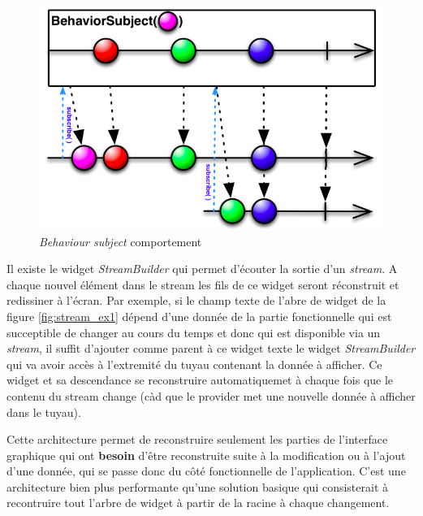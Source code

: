 \begin{figure}[H]
  \includegraphics[width=.7\linewidth]{content/imgs/stream.png}
  \caption{\textit{Behaviour subject} comportement}
  \label{fig:stream}
\end{figure}

Il existe le widget \textit{StreamBuilder} qui permet d'écouter la sortie d'un \textit{stream}. A chaque nouvel élément dans le stream les fils de ce widget seront réconstruit et redissiner à l'écran. Par exemple, si le champ texte de l'abre de widget de la figure \ref{fig:stream_ex1} dépend d'une donnée de la partie fonctionnelle qui est succeptible de changer au cours du temps et donc qui est disponible via un \textit{stream}, il suffit d'ajouter comme parent à ce widget texte le widget \textit{StreamBuilder} qui va avoir accès à l'extremité du tuyau contenant la donnée à afficher. Ce widget et sa descendance se reconstruire automatiquemet à chaque fois que le contenu du stream change (càd que le provider met une nouvelle donnée à afficher dans le tuyau).

Cette architecture permet de reconstruire seulement les parties de l'interface graphique qui ont \textbf{besoin} d'être reconstruite suite à la modification ou à l'ajout d'une donnée, qui se passe donc du côté fonctionnelle de l'application. C'est une architecture bien plus performante qu'une solution basique qui consisterait à recontruire tout l'arbre de widget à partir de la racine à chaque changement.

